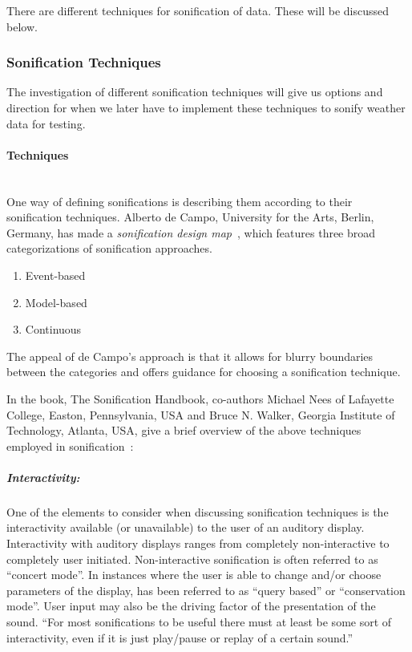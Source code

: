 There are different techniques for sonification of data. 
These will be discussed below.



\subsubsection{Sonification Techniques} %
\label{ssub:sonification_techniques}

The investigation of different sonification techniques will give us options and direction for when we later have to implement these techniques to sonify weather data for testing.

\paragraph{Techniques} %
\label{par:techniques} \hspace{0pt} \\
One way of defining sonifications is describing them according to their sonification techniques. Alberto de Campo, University for the Arts, Berlin, Germany, has made a \emph{sonification design map}~\cite[pp. 15]{Hermann2011}, which features three broad categorizations of sonification approaches.

\begin{enumerate}
    \item Event-based
    \item Model-based
    \item Continuous
\end{enumerate}

The appeal of de Campo’s approach is that it allows for blurry boundaries between the categories and offers guidance for choosing a sonification technique.

In the book, The Sonification Handbook, co-authors Michael Nees of Lafayette College, Easton, Pennsylvania, USA and Bruce N. Walker, Georgia Institute of Technology, Atlanta, USA, give a brief overview of the above techniques employed in sonification~\cite[pp. 16-17]{Hermann2011}:

\subparagraph{Interactivity:} %
\label{subp:interactivity}
One of the elements to consider when discussing sonification techniques is the interactivity available (or unavailable) to the user of an auditory display. 
Interactivity with auditory displays ranges from completely non-interactive to completely user initiated.
Non-interactive sonification is often referred to as \enquote{concert mode}. 
In instances where the user is able to change and/or choose parameters of the display, has been referred to as \enquote{query based} or \enquote{conservation mode}. User input may also be the driving factor of the presentation of the sound. \enquote{For most sonifications to be useful there must at least be some sort of interactivity, even if it is just play/pause or replay of a certain sound.} 

